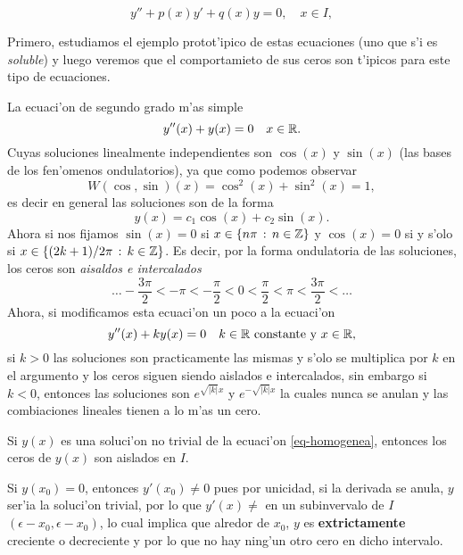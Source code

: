 \documentclass[main.tex]{subfiles}
\begin{document}
\begin{equation}
y''+p(x)y'+q(x)y=0,\quad x\in I,
\end{equation}

Primero, estudiamos el ejemplo protot'ipico de estas ecuaciones (uno que s'i es \emph{soluble}) y luego veremos que el comportamieto de sus ceros son t'ipicos para este tipo de ecuaciones.

\eje La ecuaci'on de segundo grado m'as simple
\[
  y''(x)+y(x)=0\quad x\in\mathbb R .
\]
Cuyas soluciones linealmente independientes son \(\cos(x)\) y \(\sin(x)\) (las bases de los fen'omenos ondulatorios), ya que como podemos observar
\[
  W(\cos,\sin)(x)=\cos^{2}(x)+\sin^{2}(x)=1,
\]
es decir en general las soluciones son de la forma
\[
  y(x)=c_{1}\cos(x)+c_{2}\sin(x).
\]
Ahora si nos fijamos \(\sin(x)=0\) si \(x\in\{n\pi\,:\,n\in \mathbb Z \}\) y \(\cos(x)=0\) si y s'olo si \hbox{\(x\in\{(2k+1)/2\pi\,:\,k\in \mathbb Z \}\)}. Es decir, por la forma ondulatoria de las soluciones, los ceros son \emph{aisaldos e intercalados}
\[
  \dots-\frac{3\pi}{2}<-\pi<-\frac{\pi}{2}<0<\frac{\pi}{2}<\pi<\frac{3\pi}{2}<\dots
\]
Ahora, si modificamos esta ecuaci'on un poco a la ecuaci'on
\[
  y''(x)+ky(x)=0\quad k\in\mathbb R \text{ constante y }x\in\mathbb R ,
\]
si \(k>0\) las soluciones son practicamente las mismas y s'olo se multiplica por \(k\) en el argumento y los ceros siguen siendo aislados e intercalados, sin embargo si \(k<0\), entonces las soluciones son \(e^{\sqrt{|k|}x}\) y \(e^{-\sqrt{|k|}x}\) la cuales nunca se anulan y las combiaciones lineales tienen a lo m'as un cero.

\begin{lema}
  Si \(y(x)\) es una soluci'on no trivial de la ecuaci'on \ref{eq-homogenea}, entonces los ceros de \(y(x)\) son aislados en \(I\).
\end{lema}
\dem Si \(y(x_{0})=0\), entonces \(y'(x_{0})\neq0\) pues por unicidad, si la derivada se anula, \(y\) ser'ia la soluci'on trivial, por lo que \(y'(x)\neq\) en un subinvervalo de \(I\) \((\epsilon-x_{0},\epsilon-x_{0})\), lo cual implica que alredor de \(x_{0}\), \(y\) es \textbf{extrictamente} creciente o decreciente y por lo que no hay ning'un otro cero en dicho intervalo.
\QED\\
\end{document}
